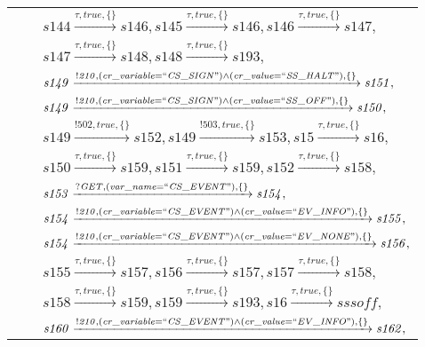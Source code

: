 \begin{tabular}{lcl}
& & $\mathit{s144}\xrightarrow{\mathit{\tau}, \mathit{true}, \{\}}\mathit{s146},\mathit{s145}\xrightarrow{\mathit{\tau}, \mathit{true}, \{\}}\mathit{s146},\mathit{s146}\xrightarrow{\mathit{\tau}, \mathit{true}, \{\}}\mathit{s147},$ \\
& & $\mathit{s147}\xrightarrow{\mathit{\tau}, \mathit{true}, \{\}}\mathit{s148},\mathit{s148}\xrightarrow{\mathit{\tau}, \mathit{true}, \{\}}\mathit{s193},$ \\
& & $\mathit{s149}\xrightarrow{\mathit{!210}, \mathit{(cr\_variable = ``CS\_SIGN") \land (cr\_value = ``SS\_HALT")}, \{\}}\mathit{s151},$ \\
& & $\mathit{s149}\xrightarrow{\mathit{!210}, \mathit{(cr\_variable = ``CS\_SIGN") \land (cr\_value = ``SS\_OFF")}, \{\}}\mathit{s150},$ \\
& & $\mathit{s149}\xrightarrow{\mathit{!502}, \mathit{true}, \{\}}\mathit{s152},\mathit{s149}\xrightarrow{\mathit{!503}, \mathit{true}, \{\}}\mathit{s153},\mathit{s15}\xrightarrow{\mathit{\tau}, \mathit{true}, \{\}}\mathit{s16},$ \\
& & $\mathit{s150}\xrightarrow{\mathit{\tau}, \mathit{true}, \{\}}\mathit{s159},\mathit{s151}\xrightarrow{\mathit{\tau}, \mathit{true}, \{\}}\mathit{s159},\mathit{s152}\xrightarrow{\mathit{\tau}, \mathit{true}, \{\}}\mathit{s158},$ \\
& & $\mathit{s153}\xrightarrow{\mathit{?GET}, \mathit{(var\_name = ``CS\_EVENT")}, \{\}}\mathit{s154},$ \\
& & $\mathit{s154}\xrightarrow{\mathit{!210}, \mathit{(cr\_variable = ``CS\_EVENT") \land (cr\_value = ``EV\_INFO")}, \{\}}\mathit{s155},$ \\
& & $\mathit{s154}\xrightarrow{\mathit{!210}, \mathit{(cr\_variable = ``CS\_EVENT") \land (cr\_value = ``EV\_NONE")}, \{\}}\mathit{s156},$ \\
& & $\mathit{s155}\xrightarrow{\mathit{\tau}, \mathit{true}, \{\}}\mathit{s157},\mathit{s156}\xrightarrow{\mathit{\tau}, \mathit{true}, \{\}}\mathit{s157},\mathit{s157}\xrightarrow{\mathit{\tau}, \mathit{true}, \{\}}\mathit{s158},$ \\
& & $\mathit{s158}\xrightarrow{\mathit{\tau}, \mathit{true}, \{\}}\mathit{s159},\mathit{s159}\xrightarrow{\mathit{\tau}, \mathit{true}, \{\}}\mathit{s193},\mathit{s16}\xrightarrow{\mathit{\tau}, \mathit{true}, \{\}}\mathit{sssoff},$ \\
& & $\mathit{s160}\xrightarrow{\mathit{!210}, \mathit{(cr\_variable = ``CS\_EVENT") \land (cr\_value = ``EV\_INFO")}, \{\}}\mathit{s162},$ \\
\end{tabular}

